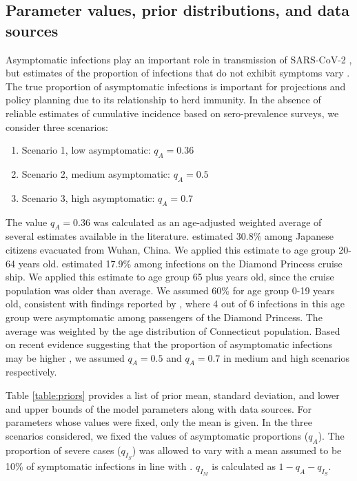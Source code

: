 \documentclass[11pt]{article}
\begin{document}


\subsection{Parameter values, prior distributions, and data sources}

Asymptomatic infections play an important role in transmission of SARS-CoV-2 \citep{furukawa2020evidence}, but estimates of the proportion of infections that do not exhibit symptoms vary \citep{he2020estimation, nishiura2020estimation, mizumoto2020estimating, emery2020contribution}. The true proportion of asymptomatic infections is important for projections and policy planning due to its relationship to herd immunity. In the absence of reliable estimates of cumulative incidence based on sero-prevalence surveys, we consider three scenarios: 

\begin{enumerate}
	\item Scenario 1, low asymptomatic: $q_A = 0.36$
	\item Scenario 2, medium asymptomatic: $q_A = 0.5$
	\item Scenario 3, high asymptomatic: $q_A = 0.7$
\end{enumerate}

The value $q_A = 0.36$ was calculated as an age-adjusted weighted average of several estimates available in the literature.  
\citet{nishiura2020estimation} estimated 30.8\% among Japanese citizens evacuated from Wuhan, China. We applied this estimate to age group 20-64 years old.  
\citet{mizumoto2020estimating} estimated 17.9\% among infections on the Diamond Princess cruise ship. We applied this estimate to age group 65 plus years old, since the cruise population was older than average.
We assumed 60\% for age group 0-19 years old, consistent with findings reported by \citet{russell2020estimating}, where 4 out of 6 infections in this age group were asymptomatic among passengers of the Diamond Princess. 
The average was weighted by the age distribution of Connecticut population. 
Based on recent evidence suggesting that the proportion of asymptomatic infections may be higher \citep{he2020estimation, emery2020contribution, kimball2020asymptomatic}, we assumed $q_A = 0.5$ and $q_A = 0.7$ in medium and high scenarios respectively.  

Table \ref{table:priors} provides a list of prior mean, standard deviation, and lower and upper bounds of the model parameters along with data sources. For parameters whose values were fixed, only the mean is given. In the three scenarios considered, we fixed the values of asymptomatic proportions ($q_A$). The proportion of severe cases ($q_{I_S}$) was allowed to vary with a mean assumed to be 10\% of symptomatic infections in line with \citep{verity2020estimates, bi2020epidemiology, salje2020estimating}. $q_{I_M}$ is calculated as $1 - q_A - q_{I_S}$. 
\end{document}
